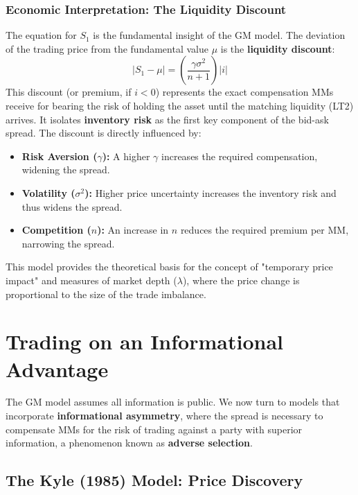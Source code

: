 \subsubsection{Economic Interpretation: The Liquidity Discount}

The equation for $S_1$ is the fundamental insight of the GM model. The deviation of the trading price from the fundamental value $\mu$ is the \textbf{liquidity discount}:
\begin{equation}
    |S_1 - \mu| = \left( \frac{\gamma \sigma^2}{n+1} \right) |i|
\end{equation}
This discount (or premium, if $i<0$) represents the exact compensation MMs receive for bearing the risk of holding the asset until the matching liquidity (LT2) arrives. It isolates \textbf{inventory risk} as the first key component of the bid-ask spread. The discount is directly influenced by:
\begin{itemize}
    \item \textbf{Risk Aversion ($\gamma$):} A higher $\gamma$ increases the required compensation, widening the spread.
    \item \textbf{Volatility ($\sigma^2$):} Higher price uncertainty increases the inventory risk and thus widens the spread.
    \item \textbf{Competition ($n$):} An increase in $n$ reduces the required premium per MM, narrowing the spread.
\end{itemize}

This model provides the theoretical basis for the concept of "temporary price impact" and measures of market depth ($\lambda$), where the price change is proportional to the size of the trade imbalance.

\section{Trading on an Informational Advantage}
\label{sec:informational-advantage}

The GM model assumes all information is public. We now turn to models that incorporate \textbf{informational asymmetry}, where the spread is necessary to compensate MMs for the risk of trading against a party with superior information, a phenomenon known as \textbf{adverse selection}.

\subsection{The Kyle (1985) Model: Price Discovery}
\label{sec:kyle}

